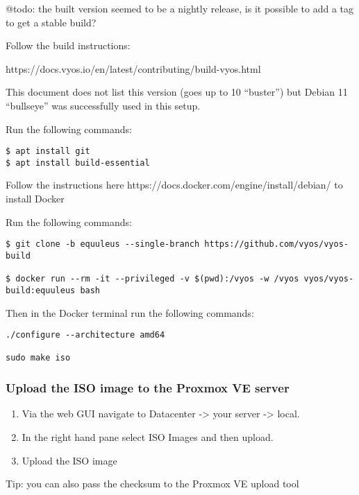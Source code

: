 @todo: the built version seemed to be a nightly release, is it possible
to add a tag to get a stable build?

Follow the build instructions:

https://docs.vyos.io/en/latest/contributing/build-vyos.html

This document does not list this version (goes up to 10 ``buster'') but
Debian 11 ``bullseye'' was successfully used in this setup.

Run the following commands:

\begin{verbatim}
$ apt install git
$ apt install build-essential
\end{verbatim}

Follow the instructions here
https://docs.docker.com/engine/install/debian/ to install Docker

Run the following commands:

\begin{verbatim}
$ git clone -b equuleus --single-branch https://github.com/vyos/vyos-build

$ docker run --rm -it --privileged -v $(pwd):/vyos -w /vyos vyos/vyos-build:equuleus bash
\end{verbatim}

Then in the Docker terminal run the following commands:

\begin{verbatim}
./configure --architecture amd64

sudo make iso
\end{verbatim}

\hypertarget{upload-the-iso-image-to-the-proxmox-ve-server}{%
\subsubsection{Upload the ISO image to the Proxmox VE
server}\label{upload-the-iso-image-to-the-proxmox-ve-server}}

\begin{enumerate}
\def\labelenumi{\arabic{enumi}.}
\item
  Via the web GUI navigate to Datacenter -\textgreater{} your server
  -\textgreater{} local.
\item
  In the right hand pane select ISO Images and then upload.
\item
  Upload the ISO image
\end{enumerate}

Tip: you can also pass the checksum to the Proxmox VE upload tool

